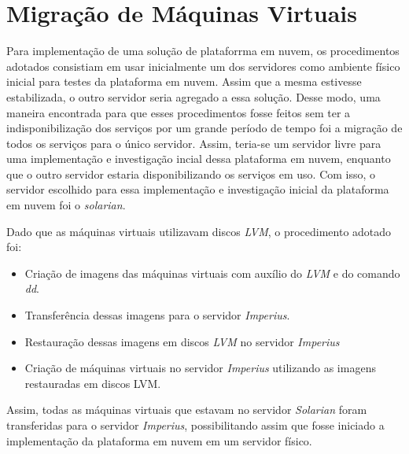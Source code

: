 \section{Migração de Máquinas Virtuais}
Para implementação de uma solução de plataforrma em nuvem, os procedimentos adotados consistiam em usar inicialmente um dos servidores como ambiente físico inicial para testes da plataforma em nuvem. Assim que a mesma estivesse estabilizada, o outro servidor seria agregado a essa solução. Desse modo, uma maneira encontrada para que esses procedimentos fosse feitos sem ter a indisponibilização dos serviços por um grande período de tempo foi a migração de todos os serviços para o único servidor. Assim, teria-se um servidor livre para uma implementação e investigação incial dessa plataforma em nuvem, enquanto que o outro servidor estaria disponibilizando os serviços em uso. Com isso, o servidor escolhido para essa implementação e investigação inicial da plataforma em nuvem foi o \textit{solarian}. 

Dado que as máquinas virtuais utilizavam discos \textit{LVM}, o procedimento adotado foi:
\begin{itemize}
  \item Criação de imagens das máquinas virtuais com auxílio do \textit{LVM} e do comando \textit{dd}.
  \item Transferência dessas imagens para o servidor \textit{Imperius}.
  \item Restauração dessas imagens em discos \textit{LVM} no servidor \textit{Imperius}
  \item Criação de máquinas virtuais no servidor \textit{Imperius} utilizando as imagens restauradas em discos LVM.
  
\end{itemize}

Assim, todas as máquinas virtuais que estavam no servidor \textit{Solarian} foram transferidas para o servidor \textit{Imperius}, possibilitando assim que fosse iniciado a implementação da plataforma em nuvem em um servidor físico.

\section{}
